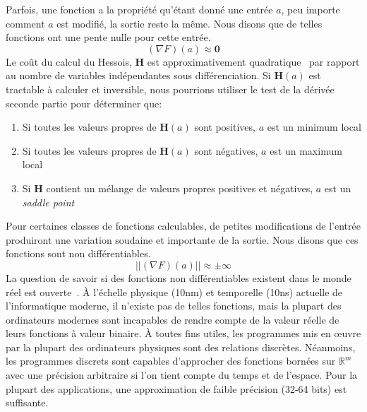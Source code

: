 \noindent Parfois, une fonction a la propriété qu'étant donné une entrée $a$, peu importe comment $a$ est modifié, la sortie reste la même. Nous disons que de telles fonctions ont une pente nulle pour cette entrée.
%
\begin{equation}
    (\nabla F)(a) \approx \mathbf{0}
\end{equation}
%
Le coût du calcul du Hessois, $\mathbf{H}$ est approximativement quadratique~\citep{griewank1993some} par rapport au nombre de variables indépendantes sous différenciation. Si $\mathbf{H}(a)$ est tractable à calculer et inversible, nous pourrions utiliser le test de la dérivée seconde partie pour déterminer que:\\
%
\begin{enumerate}
\item Si toutes les valeurs propres de $\mathbf{H}(a)$ sont positives, $a$ est un minimum local
\item Si toutes les valeurs propres de $\mathbf{H}(a)$ sont négatives, $a$ est un maximum local
\item Si $\mathbf{H}$ contient un mélange de valeurs propres positives et négatives, $a$ est un \textit{saddle point}\\
\end{enumerate}
%
Pour certaines classes de fonctions calculables, de petites modifications de l'entrée produiront une variation soudaine et importante de la sortie. Nous disons que ces fonctions sont non différentiables.
%
\begin{equation}
    ||(\nabla F)(a)|| \approx \pm \infty
\end{equation}
%
La question de savoir si des fonctions non différentiables existent dans le monde réel est ouverte~\citep{buniy2005hilbert}. À l'échelle physique (10nm) et temporelle (10ns) actuelle de l'informatique moderne, il n'existe pas de telles fonctions, mais la plupart des ordinateurs modernes sont incapables de rendre compte de la valeur réelle de leurs fonctions à valeur binaire. À toutes fins utiles, les programmes mis en œuvre par la plupart des ordinateurs physiques sont des relations discrètes. Néanmoins, les programmes discrets sont capables d'approcher des fonctions bornées sur $\mathbb{R}^m$ avec une précision arbitraire si l'on tient compte du temps et de l'espace. Pour la plupart des applications, une approximation de faible précision (32-64 bits) est suffisante.


